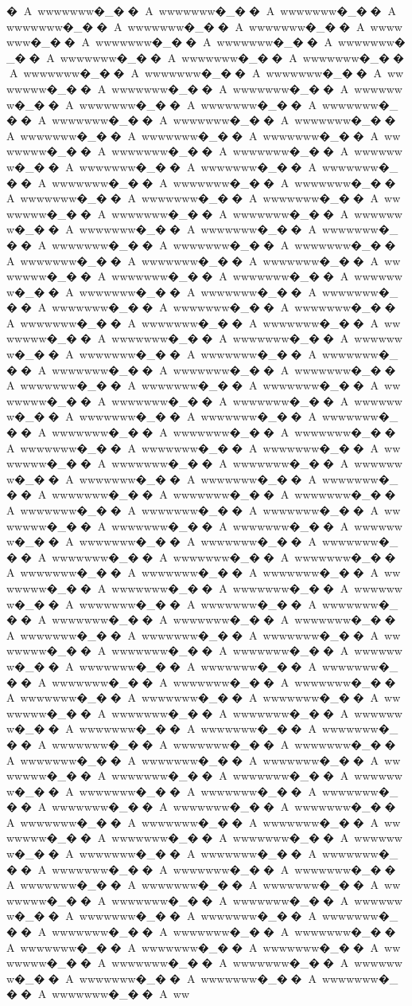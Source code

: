 {{{{{{{{{{{{{{{{{{{{{{{{{{{{{{{{{�A~wwwwwww�_��A~wwwwwww�_��A~wwwwwww�_��A~wwwwwww�_��A~wwwwwww�_��A~wwwwwww�_��A~wwwwwww�_��A~wwwwwww�_��A~wwwwwww�_��A~wwwwwww�_��A~wwwwwww�_��A~wwwwwww�_��A~wwwwwww�_��A~wwwwwww�_��A~wwwwwww�_��A~wwwwwww�_��A~wwwwwww�_��A~wwwwwww�_��A~wwwwwww�_��A~wwwwwww�_��A~wwwwwww�_��A~wwwwwww�_��A~wwwwwww�_��A~wwwwwww�_��A~wwwwwww�_��A~wwwwwww�_��A~wwwwwww�_��A~wwwwwww�_��A~wwwwwww�_��A~wwwwwww�_��A~wwwwwww�_��A~wwwwwww�_��A~wwwwwww�_��A~wwwwwww�_��A~wwwwwww�_��A~wwwwwww�_��A~wwwwwww�_��A~wwwwwww�_��A~wwwwwww�_��A~wwwwwww�_��A~wwwwwww�_��A~wwwwwww�_��A~wwwwwww�_��A~wwwwwww�_��A~wwwwwww�_��A~wwwwwww�_��A~wwwwwww�_��A~wwwwwww�_��A~wwwwwww�_��A~wwwwwww�_��A~wwwwwww�_��A~wwwwwww�_��A~wwwwwww�_��A~wwwwwww�_��A~wwwwwww�_��A~wwwwwww�_��A~wwwwwww�_��A~wwwwwww�_��A~wwwwwww�_��A~wwwwwww�_��A~wwwwwww�_��A~wwwwwww�_��A~wwwwwww�_��A~wwwwwww�_��A~wwwwwww�_��A~wwwwwww�_��A~wwwwwww�_��A~wwwwwww�_��A~wwwwwww�_��A~wwwwwww�_��A~wwwwwww�_��A~wwwwwww�_��A~wwwwwww�_��A~wwwwwww�_��A~wwwwwww�_��A~wwwwwww�_��A~wwwwwww�_��A~wwwwwww�_��A~wwwwwww�_��A~wwwwwww�_��A~wwwwwww�_��A~wwwwwww�_��A~wwwwwww�_��A~wwwwwww�_��A~wwwwwww�_��A~wwwwwww�_��A~wwwwwww�_��A~wwwwwww�_��A~wwwwwww�_��A~wwwwwww�_��A~wwwwwww�_��A~wwwwwww�_��A~wwwwwww�_��A~wwwwwww�_��A~wwwwwww�_��A~wwwwwww�_��A~wwwwwww�_��A~wwwwwww�_��A~wwwwwww�_��A~wwwwwww�_��A~wwwwwww�_��A~wwwwwww�_��A~wwwwwww�_��A~wwwwwww�_��A~wwwwwww�_��A~wwwwwww�_��A~wwwwwww�_��A~wwwwwww�_��A~wwwwwww�_��A~wwwwwww�_��A~wwwwwww�_��A~wwwwwww�_��A~wwwwwww�_��A~wwwwwww�_��A~wwwwwww�_��A~wwwwwww�_��A~wwwwwww�_��A~wwwwwww�_��A~wwwwwww�_��A~wwwwwww�_��A~wwwwwww�_��A~wwwwwww�_��A~wwwwwww�_��A~wwwwwww�_��A~wwwwwww�_��A~wwwwwww�_��A~wwwwwww�_��A~wwwwwww�_��A~wwwwwww�_��A~wwwwwww�_��A~wwwwwww�_��A~wwwwwww�_��A~wwwwwww�_��A~wwwwwww�_��A~wwwwwww�_��A~wwwwwww�_��A~wwwwwww�_��A~wwwwwww�_��A~wwwwwww�_��A~wwwwwww�_��A~wwwwwww�_��A~wwwwwww�_��A~wwwwwww�_��A~wwwwwww�_��A~wwwwwww�_��A~wwwwwww�_��A~wwwwwww�_��A~wwwwwww�_��A~wwwwwww�_��A~wwwwwww�_��A~wwwwwww�_��A~wwwwwww�_��A~wwwwwww�_��A~wwwwwww�_��A~wwwwwww�_��A~wwwwwww�_��A~wwwwwww�_��A~wwwwwww�_��A~wwwwwww�_��A~wwwwwww�_��A~wwwwwww�_��A~wwwwwww�_��A~wwwwwww�_��A~wwwwwww�_��A~wwwwwww�_��A~wwwwwww�_��A~wwwwwww�_��A~wwwwwww�_��A~wwwwwww�_��A~wwwwwww�_��A~wwwwwww�_��A~wwwwwww�_��A~wwwwwww�_��A~wwwwwww�_��A~wwwwwww�_��A~wwwwwww�_��A~wwwwwww�_��A~wwwwwww�_��A~wwwwwww�_��A~wwwwwww�_��A~wwwwwww�_��A~wwwwwww�_��A~wwwwwww�_��A~wwwwwww�_��A~wwwwwww�_��A~wwwwwww�_��A~wwwwwww�_��A~wwwwwww�_��A~wwwwwww�_��A~wwwwwww�_��A~wwwwwww�_��A~wwwwwww�_��A~wwwwwww�_��A~wwwwwww�_��A~wwwwwww�_��A~wwwwwww�_��A~wwwwwww�_��A~wwwwwww�_��A~wwwwwww�_��A~wwwwwww�_��A~wwwwwww�_��A~wwwwwww�_��A~wwwwwww�_��A~wwwwwww�_��A~wwwwwww�_��A~wwwwwww�_��A~ww}}}}}}}}}}}}}}}}}}}}}}}}}}}}}}}}}
